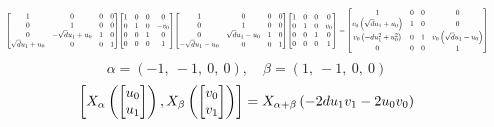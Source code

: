 \documentclass[11pt]{article}
\theoremstyle{definition}
\begin{document}
\[
\scaletoalign{\textwidth}{{\left[\begin{matrix}1 & 0 & 0 & 0\\0 & 1 & 0 & 0\\0 & - \sqrt{d} u_{1} + u_{0} & 1 & 0\\\sqrt{d} u_{1} + u_{0} & 0 & 0 & 1\end{matrix}\right]} {\left[\begin{matrix}1 & 0 & 0 & 0\\0 & 1 & 0 & - v_{0}\\0 & 0 & 1 & 0\\0 & 0 & 0 & 1\end{matrix}\right]} {\left[\begin{matrix}1 & 0 & 0 & 0\\0 & 1 & 0 & 0\\0 & \sqrt{d} u_{1} - u_{0} & 1 & 0\\- \sqrt{d} u_{1} - u_{0} & 0 & 0 & 1\end{matrix}\right]} {\left[\begin{matrix}1 & 0 & 0 & 0\\0 & 1 & 0 & v_{0}\\0 & 0 & 1 & 0\\0 & 0 & 0 & 1\end{matrix}\right]} = {\left[\begin{matrix}1 & 0 & 0 & 0\\v_{0} \left(\sqrt{d} u_{1} + u_{0}\right) & 1 & 0 & 0\\v_{0} \left(- d u_{1}^{2} + u_{0}^{2}\right) & 0 & 1 & v_{0} \left(\sqrt{d} u_{1} - u_{0}\right)\\0 & 0 & 0 & 1\end{matrix}\right]}}
\]
\[
\alpha = \left( -1, \  -1, \  0, \  0\right), \quad \beta = \left( 1, \  -1, \  0, \  0\right)
\]
\[
\scaletoalign{\textwidth}{\left[ X_{\alpha}\left(\left[\begin{matrix}u_{0}\\u_{1}\end{matrix}\right]\right), X_{\beta}\left(\left[\begin{matrix}v_{0}\\v_{1}\end{matrix}\right]\right) \right] = X_{\alpha + \beta}\left(- 2 d u_{1} v_{1} - 2 u_{0} v_{0}\right)}
\]
\end{document}
